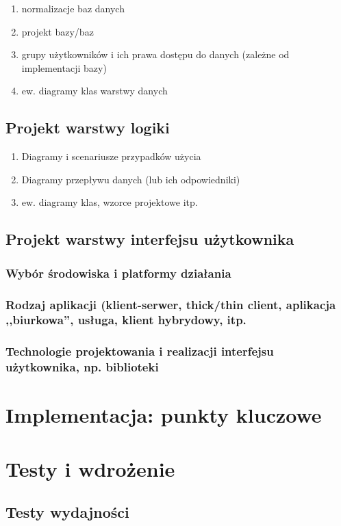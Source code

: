 \documentclass[12pt]{report}
\begin{document}
\begin{enumerate}
\item normalizacje baz danych
\item projekt bazy/baz 
\item grupy użytkowników i ich prawa dostępu do danych (zależne od implementacji bazy)
\item ew. diagramy klas warstwy danych
\end{enumerate}
\subsection{Projekt warstwy logiki}
\begin{enumerate}
\item Diagramy i scenariusze przypadków użycia
\item Diagramy przepływu danych (lub ich odpowiedniki)
\item ew. diagramy klas, wzorce projektowe itp.
\end{enumerate}

\subsection{Projekt warstwy interfejsu użytkownika}
\subsubsection{Wybór środowiska i platformy działania}
\subsubsection{Rodzaj aplikacji (klient-serwer, thick/thin client, aplikacja
,,biurkowa'', usługa, klient hybrydowy, itp.}
\subsubsection{Technologie projektowania i realizacji interfejsu użytkownika,
np. biblioteki}


\section{Implementacja: punkty kluczowe}

\section{Testy i wdrożenie}
\subsection{Testy wydajności}
\end{document}
